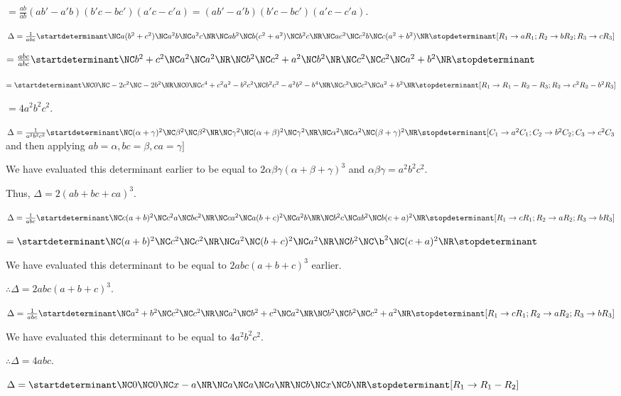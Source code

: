   $= \frac{ab}{ab}(ab' - a'b)(b'c - bc')(a'c - c'a) = (ab' - a'b)(b'c - bc')(a'c - c'a)$.
\item $\Delta = \frac{1}{abc}\startdeterminant\NC a(b^2 + c^2)\NC a^2b\NC a^2c\NR\NC ab^2\NC b(c^2 + a^2)\NC b^2c\NR\NC
  ac^2\NC c^2b\NC c(a^2 + b^2)\NR\stopdeterminant[R_1\rightarrow aR_1; R_2\rightarrow bR_2; R_3\rightarrow
  cR_3]$

  $= \frac{abc}{abc}\startdeterminant\NC b^2 + c^2\NC a^2\NC a^2\NR\NC b^2\NC c^2 + a^2\NC b^2\NR\NC c^2\NC
  c^2\NC a^2 + b^2\NR\stopdeterminant$

  $= \startdeterminant\NC 0 \NC -2c^2 \NC -2b^2\NR\NC 0 \NC c^4 + c^2a^2 - b^2c^2 \NC b^2c^2 - a^2b^2 -
  b^4\NR\NC c^2\NC c^2\NC a^2 + b^2\NR\stopdeterminant[R_1\rightarrow R_1 - R_2 - R_3; R_2\rightarrow c^2R_2
  - b^2R_3]$

  $= 4a^2b^2c^2$.
\item $\Delta = \frac{1}{a^2b^2c^2}\startdeterminant\NC(\alpha + \gamma)^2 \NC\beta^2\NC\beta^2 \NR\NC
  \gamma^2 \NC(\alpha + \beta)^2 \NC \gamma^2\NR\NC \alpha^2\NC\alpha^2\NC (\beta +
  \gamma)^2\NR\stopdeterminant[C_1\rightarrow a^2C_1; C_2\rightarrow b^2C_2; C_3\rightarrow c^2C_3$ and then
  applying $ab = \alpha, bc = \beta, ca = \gamma]$

  We have evaluated this determinant earlier to be equal to $2\alpha\beta\gamma(\alpha + \beta + \gamma)^3$
  and $\alpha\beta\gamma = a^2b^2c^2$.

  Thus, $\Delta = 2(ab + bc + ca)^3$.
\item $\Delta = \frac{1}{abc}\startdeterminant\NC c(a + b)^2\NC c^2a \NC bc^2\NR\NC ca^2\NC a(b +
  c)^2\NC a^2b\NR\NC b^2c\NC ab^2 \NC b(c + a)^2\NR\stopdeterminant[R_1\rightarrow cR_1; R_2\rightarrow
  aR_2; R_3\rightarrow bR_3]$

  $=\startdeterminant\NC (a + b)^2\NC c^2\NC c^2\NR\NC a^2\NC (b + c)^2\NC a^2\NR\NC b^2\NC\b^2\NC (c +
  a)^2\NR\stopdeterminant$

  We have evaluated this determinant to be equal to $2abc(a + b + c)^3$ earlier.

  $\therefore \Delta = 2abc(a + b + c)^3$.
\item $\Delta = \frac{1}{abc}\startdeterminant\NC a^2 + b^2\NC c^2\NC c^2\NR\NC a^2\NC b^2 + c^2 \NC
  a^2\NR\NC b^2\NC b^2\NC c^2 + a^2\NR\stopdeterminant[R_1\rightarrow cR_1; R_2\rightarrow
  aR_2; R_3\rightarrow bR_3]$

  We have evaluated this determinant to be equal to $4a^2b^2c^2$.

  $\therefore \Delta = 4abc$.
\item $\Delta = \startdeterminant\NC 0\NC 0\NC x - a\NR\NC a\NC a\NC a\NR\NC b\NC x\NC
  b\NR\stopdeterminant[R_1\rightarrow R_1 - R_2]$

